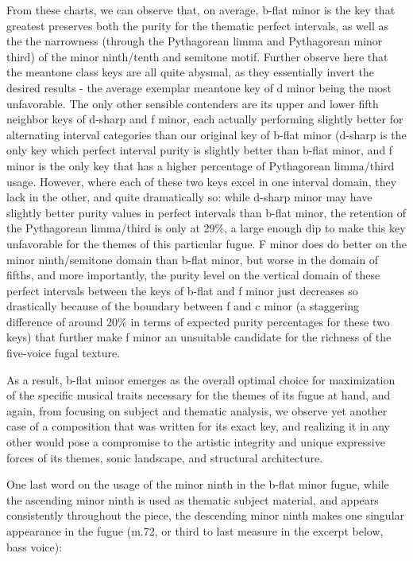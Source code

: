     From these charts, we can observe that, on average, b-flat minor is the
key that greatest preserves both the purity for the thematic perfect
intervals, as well as the the narrowness (through the Pythagorean limma
and Pythagorean minor third) of the minor ninth/tenth and semitone
motif. Further observe here that the meantone class keys are all quite
abysmal, as they essentially invert the desired results - the average
exemplar meantone key of d minor being the most unfavorable. The only
other sensible contenders are its upper and lower fifth neighbor keys of
d-sharp and f minor, each actually performing slightly better for
alternating interval categories than our original key of b-flat minor
(d-sharp is the only key which perfect interval purity is slightly
better than b-flat minor, and f minor is the only key that has a higher
percentage of Pythagorean limma/third usage. However, where each of
these two keys excel in one interval domain, they lack in the other, and
quite dramatically so: while d-sharp minor may have slightly better
purity values in perfect intervals than b-flat minor, the retention of
the Pythagorean limma/third is only at 29\%, a large enough dip to make
this key unfavorable for the themes of this particular fugue. F minor
does do better on the minor ninth/semitone domain than b-flat minor, but
worse in the domain of fifths, and more importantly, the purity level on
the vertical domain of these perfect intervals between the keys of
b-flat and f minor just decreases so drastically because of the boundary
between f and c minor (a staggering difference of around 20\% in terms
of expected purity percentages for these two keys) that further make f
minor an unsuitable candidate for the richness of the five-voice fugal
texture.

As a result, b-flat minor emerges as the overall optimal choice for
maximization of the specific musical traits necessary for the themes of
its fugue at hand, and again, from focusing on subject and thematic
analysis, we observe yet another case of a composition that was written
for its exact key, and realizing it in any other would pose a compromise
to the artistic integrity and unique expressive forces of its themes,
sonic landscape, and structural architecture.

One last word on the usage of the minor ninth in the b-flat minor fugue,
while the ascending minor ninth is used as thematic subject material,
and appears consistently throughout the piece, the descending minor
ninth makes one singular appearance in the fugue (m.72, or third to last
measure in the excerpt below, bass voice):




